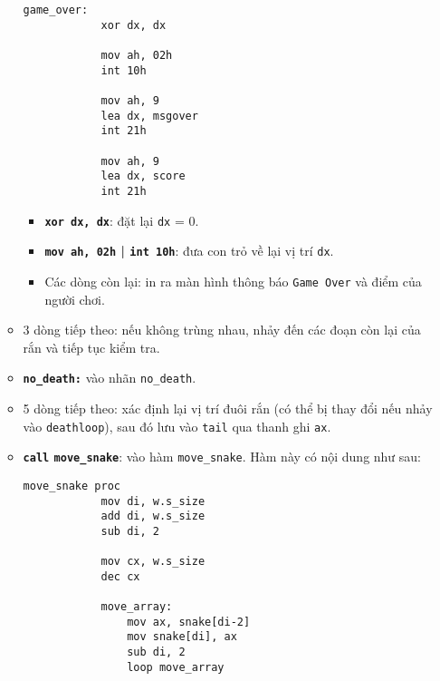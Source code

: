 \begin{itemize}
\begin{itemize}
    \vspace{0.3cm}
    \begin{lstlisting}[style=asm]
        game_over:
            xor dx, dx                      
            
            mov ah, 02h                   
            int 10h                  
            
            mov ah, 9                     
            lea dx, msgover  
            int 21h   
            
            mov ah, 9
            lea dx, score                   
            int 21h                   
    \end{lstlisting}
    \vspace{0.3cm}
    
    \begin{itemize}
        \itemsep0.2cm
        \item \textbf{\texttt{xor dx, dx}}: đặt lại \texttt{dx} = 0.
        \item \textbf{\texttt{mov ah, 02h} | \texttt{int 10h}}: đưa con trỏ về lại vị trí \texttt{dx}.
        \item Các dòng còn lại: in ra màn hình thông báo \texttt{Game Over} và điểm của người chơi.
    \end{itemize}

    \item 3 dòng tiếp theo: nếu không trùng nhau, nhảy đến các đoạn còn lại của rắn và tiếp tục kiểm tra.
    \item \textbf{\texttt{no\_death:}} vào nhãn \texttt{no\_death}.
    \item 5 dòng tiếp theo: xác định lại vị trí đuôi rắn (có thể bị thay đổi nếu nhảy vào \texttt{deathloop}), sau đó lưu vào \texttt{tail} qua thanh ghi \texttt{ax}.
    \item \textbf{\texttt{call} \texttt{move\_snake}}: vào hàm \texttt{move\_snake}. Hàm này có nội dung như sau:
    
    \vspace{0.3cm}
    \begin{lstlisting}[style=asm]
        move_snake proc
            mov di, w.s_size         
            add di, w.s_size
            sub di, 2
        
            mov cx, w.s_size         
            dec cx                   
        
            move_array:
                mov ax, snake[di-2]   
                mov snake[di], ax     
                sub di, 2            
                loop move_array       
            

\end{lstlisting}
\end{itemize}
\end{itemize}
